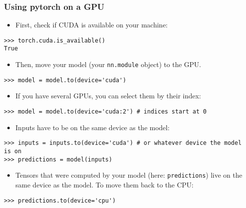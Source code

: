 \begin{frame}[fragile]
\frametitle{Using pytorch on a GPU}

\begin{itemize}
\item First, check if CUDA is available on your machine:
\end{itemize}
\begin{verbatim}
>>> torch.cuda.is_available()
True
\end{verbatim}
\begin{itemize}
\item Then, move your model (your \texttt{nn.module} object) to the GPU.
\end{itemize}
\begin{verbatim}
>>> model = model.to(device='cuda')
\end{verbatim}
\begin{itemize}
\item If you have several GPUs, you can select them by their index:
\end{itemize}
\begin{verbatim}
>>> model = model.to(device='cuda:2') # indices start at 0
\end{verbatim}
\begin{itemize}
\item Inputs have to be on the same device as the model:
\end{itemize}
\begin{verbatim}
>>> inputs = inputs.to(device='cuda') # or whatever device the model is on
>>> predictions = model(inputs)
\end{verbatim}
\begin{itemize}
\item Tensors that were computed by your model (here: \texttt{predictions}) live on the same device as the model. To move them back to the CPU:
\end{itemize}
\begin{verbatim}
>>> predictions.to(device='cpu')
\end{verbatim}
\end{frame}
	
		

\endlecture

